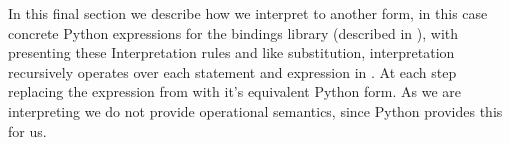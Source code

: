 In this final section we describe how we interpret \thePolicyLang to another form, in this case concrete Python expressions for the \PyOpenABE bindings library (described in ), with  presenting these Interpretation rules and like substitution, interpretation recursively operates over each statement and expression in \thePolicyLang. At each step replacing the expression from \thePolicyLang with it's equivalent Python form. As we are interpreting \thePolicyLang we do not provide operational semantics, since Python provides this for us.
